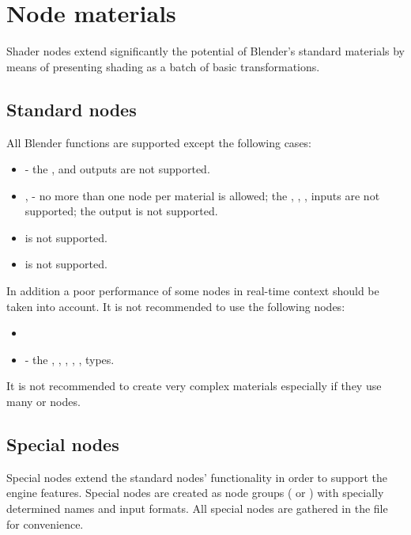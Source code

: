 \documentclass[a4paper,12pt,oneside]{sphinxmanual}
\begin{document}
\chapter{Node materials}
\label{node_materials:index-0}\label{node_materials::doc}\label{node_materials:id1}
Shader nodes extend significantly the potential of Blender's standard materials by means of presenting shading as a batch of basic transformations.


\section{Standard nodes}
\label{node_materials:id2}\label{node_materials:index-1}\label{node_materials:generic-node-materials}
All Blender functions are supported except the following cases:
\begin{itemize}
\item {} 
 - the ,  and  outputs are not supported.

\item {} 
,  - no more than one node per material is allowed; the , , ,  inputs are not supported; the  output is not supported.

\item {} 
 is not supported.

\item {} 
 is not supported.

\end{itemize}

In addition a poor performance of some nodes in real-time context should be taken into account. It is not recommended to use the following nodes:
\begin{itemize}
\item {} 

\item {} 
 - the , , , , ,  types.

\end{itemize}

It is not recommended to create very complex materials especially if they use many  or  nodes.


\section{Special nodes}
\label{node_materials:custom-node-materials}\label{node_materials:id3}
Special nodes extend the standard nodes' functionality in order to support the engine features. Special nodes are created as node groups ( or ) with specially determined names and input formats. All special nodes are gathered in the  file for convenience.
\end{document}
